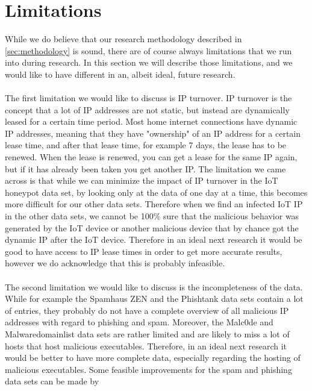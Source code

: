 \documentclass[a4paper,10pt]{article}
\begin{document}
\section{Limitations} \label{sec:limitations}
While we do believe that our research methodology described in \autoref{sec:methodology} is sound, there are of course always 
limitations that we run into during research. In this section we will describe those limitations, and we would like to have different
in an, albeit ideal, future research.
\\\\
The first limitation we would like to discuss is IP turnover. IP turnover is the concept that a lot of IP addresses are not static, but instead are
dynamically leased for a certain time period. Most home internet connections have dynamic IP addresses, meaning that they have
"ownership" of an IP address for a certain lease time, and after that lease time, for example 7 days, the lease has to be renewed. When
the lease is renewed, you can get a lease for the same IP again, but if it has already been taken you get another IP. The limitation
we came across is that while we can minimize the impact of IP turnover in the IoT honeypot data set, by looking only at the data of
one day at a time, this becomes more difficult for our other data sets. Therefore when we find an infected IoT IP in the other data sets,
we cannot be 100\% sure that the malicious behavior was generated by the IoT device or another malicious device that by chance
got the dynamic IP after the IoT device. Therefore in an ideal next research it would be good to have access to IP lease times in order
to get more accurate results, however we do acknowledge that this is probably infeasible.
\\\\
The second limitation we would like to discuss is the incompleteness of the data. While for example the Spamhaus ZEN and the 
Phishtank data sets contain a lot of entries, they probably do not have a complete overview of all malicious IP addresses with regard
to phishing and spam. Moreover, the Malc0de and Malwaredomainlist data sets are rather limited and are likely to miss a lot of 
hosts that host malicious executables. Therefore, in an ideal next research it would be better to have more complete data, especially
regarding the hosting of malicious executables. Some feasible improvements for the spam and phishing data sets can be made by 
\end{document}
